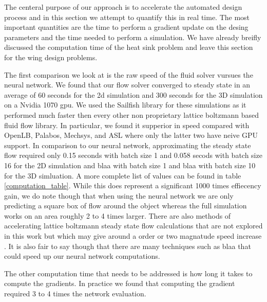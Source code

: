 \documentclass{article} %
\begin{document}
The centeral purpose of our approach is to accelerate the automated design process and in this section we attempt to quantify this in real time. The most important quantities are the time to perform a gradient update on the desing parameters and the time needed to perform a simulation. We have already breifly discussed the computation time of the heat sink problem and leave this section for the wing design problems.

The first comparison we look at is the raw speed of the fluid solver vursues the neural network. We found that our flow solver converged to steady state in an average of 60 seconds for the 2d simulation and 300 seconds for the 3D simulation on a Nvidia 1070 gpu. We used the Sailfish library \cite{januszewski2014sailfish} for these simulations as it performed much faster then every other non proprietary lattice boltzmann based fluid flow library. In particular, we found it supperior in speed compared with OpenLB, Palabos, Mechsys, and ASL where only the latter two have neive GPU support. In comparison to our neural network, approximating the steady state flow required only 0.15 seconds with batch size 1 and 0.058 secods with batch size 16 for the 2D simulation and blaa with batch size 1 and blaa with batch size 10 for the 3D simluation. A more complete list of values can be found in table \ref{computation_table}. While this does represent a significant 1000 times effiecency gain, we do note though that when using the neural network we are only predicting a square box of flow around the object whereas the full simulation works on an area roughly 2 to 4 times larger. There are also methods of accelerating lattice boltzmann steady state flow calculations that are not explored in this work but which may give around a order or two magnatude speed increase \cite{guo2013lattice} \cite{bernaschi2002computing}. It is also fair to say though that there are many techniques such as blaa that could speed up our neural network computations.

The other computation time that needs to be addressed is how long it takes to compute the gradients. In practice we found that computing the gradient required 3 to 4 times the network evaluation.
\end{document}
